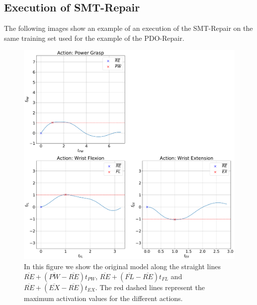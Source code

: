 \subsection{Execution of SMT-Repair}\label{subsec:SMT-Repair}
The following images show an example of an execution of the SMT-Repair on the same training set used for the example of the PDO-Repair.
\begin{figure}[H]
    \centering
    \includegraphics[width=\textwidth]{Images/repair-example/SMT-State0.pdf}
    \caption{In this figure we show the original model along the straight lines $\overline{RE} + (\overline{PW} - \overline{RE})t_{PW}$, $\overline{RE} + (\overline{FL} - \overline{RE})t_{FL}$ and $\overline{RE} + (\overline{EX} - \overline{RE})t_{EX}$. The red dashed lines represent the maximum activation values for the different actions.}
    \label{fig:SMT-exec-0}
\end{figure}
